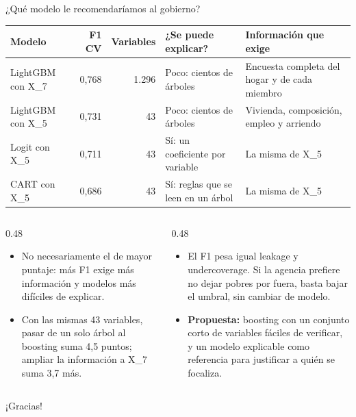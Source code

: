 \documentclass[aspectratio=169, 10pt]{beamer}
\begin{document}
\begin{frame}{¿Qu\'e modelo le recomendar\'iamos al gobierno?}
  \vspace{5mm}
  \centering
  {\scriptsize
  \begin{tabular}{lrr>{\raggedright\arraybackslash}p{}>{\raggedright\arraybackslash}p{}}
    \toprule
    Modelo & F1 CV & Variables & ¿Se puede explicar? & Informaci\'on que exige \\
    \midrule
    LightGBM con X\_7 & 0,768 & 1.296 & Poco: cientos de \'arboles & Encuesta completa del hogar y de cada miembro \\
    LightGBM con X\_5 & 0,731 & 43 & Poco: cientos de \'arboles & Vivienda, composici\'on, empleo y arriendo \\
    Logit con X\_5 & 0,711 & 43 & S\'i: un coeficiente por variable & La misma de X\_5 \\
    CART con X\_5 & 0,686 & 43 & S\'i: reglas que se leen en un \'arbol & La misma de X\_5 \\
    \bottomrule
  \end{tabular}}

  \vspace{4mm}
  \begin{columns}[T, onlytextwidth]
    \begin{column}{0.48\textwidth}
      \footnotesize
      \begin{itemize}
        \item No necesariamente el de mayor puntaje: m\'as F1 exige m\'as informaci\'on y modelos m\'as dif\'iciles de explicar.
        \item Con las mismas 43 variables, pasar de un solo \'arbol al boosting suma 4,5 puntos; ampliar la informaci\'on a X\_7 suma 3,7 m\'as.
      \end{itemize}
    \end{column}
    \begin{column}{0.48\textwidth}
      \footnotesize
      \begin{itemize}
        \item El F1 pesa igual leakage y undercoverage. Si la agencia prefiere no dejar pobres por fuera, basta bajar el umbral, sin cambiar de modelo.
        \item \textbf{Propuesta:} boosting con un conjunto corto de variables f\'aciles de verificar, y un modelo explicable como referencia para justificar a qui\'en se focaliza.
      \end{itemize}
    \end{column}
  \end{columns}
\end{frame}

\appendix

\begin{frame}[standout]
  ¡Gracias!
\end{frame}
\end{document}
